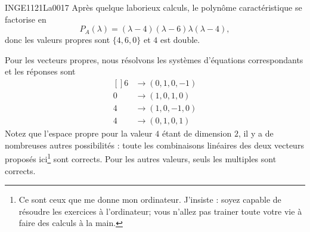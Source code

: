 \begin{corrige}{INGE1121La0017}
	Après quelque laborieux calculs, le polynôme caractéristique se factorise en
	\begin{equation}
		P_A(\lambda)=(\lambda-4)(\lambda-6)\lambda(\lambda-4),
	\end{equation}
	donc les valeurs propres sont $\{ 4,6,0 \}$ et $4$ est double.

	Pour les vecteurs propres, nous résolvons les systèmes d'équations correspondants et les réponses sont
	\begin{equation}		\label{EqVectosDSProps}
		\begin{aligned}[]
			6 &\to (0, 1, 0, -1)\\
			0 &\to (1, 0, 1, 0)\\
			4 &\to (1, 0, -1, 0)\\
			4 &\to (0, 1, 0, 1)
		\end{aligned}
	\end{equation}
	Notez que l'espace propre pour la valeur $4$ étant de dimension $2$, il y a de nombreuses autres possibilités : toute les combinaisons linéaires des deux vecteurs proposés ici\footnote{Ce sont ceux que me donne mon ordinateur. J'insiste : soyez capable de résoudre les exercices à l'ordinateur; vous n'allez pas trainer toute votre vie à faire des calculs à la main.} sont corrects. Pour les autres valeurs, seuls les multiples sont corrects.


\end{corrige}
